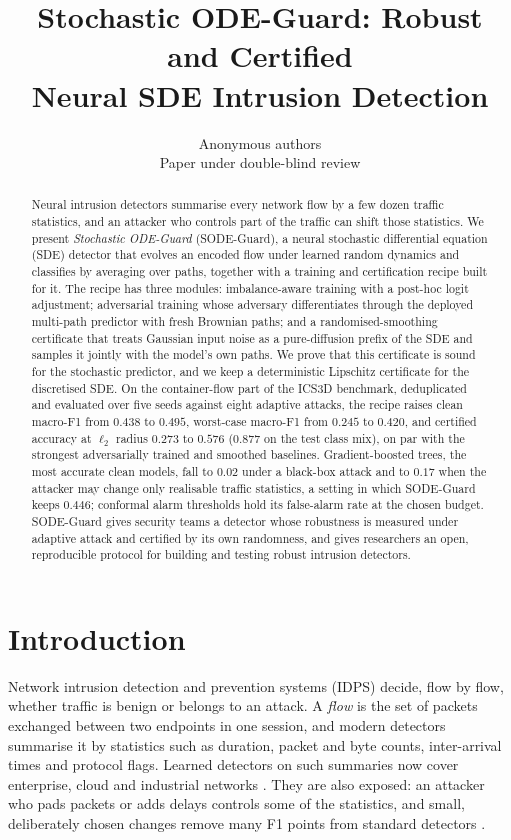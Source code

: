 \documentclass{article}
\title{Stochastic ODE-Guard: Robust and Certified\\Neural SDE Intrusion Detection}
\author{Anonymous authors\\Paper under double-blind review}
\theoremstyle{definition}
\begin{document}
\maketitle

\begin{abstract}
Neural intrusion detectors summarise every network flow by a few dozen traffic
statistics, and an attacker who controls part of the traffic can shift those
statistics. We present \emph{Stochastic ODE-Guard} (SODE-Guard), a neural
stochastic differential equation (SDE) detector that evolves an encoded flow
under learned random dynamics and classifies by averaging over paths, together
with a training and certification recipe built for it. The recipe has three
modules: imbalance-aware training with a post-hoc logit adjustment; adversarial
training whose adversary differentiates through the deployed multi-path
predictor with fresh Brownian paths; and a randomised-smoothing certificate
that treats Gaussian input noise as a pure-diffusion prefix of the SDE and
samples it jointly with the model's own paths. We prove that this certificate
is sound for the stochastic predictor, and we keep a deterministic Lipschitz
certificate for the discretised SDE. On the container-flow part of the ICS3D
benchmark, deduplicated and evaluated over five seeds against eight adaptive
attacks, the recipe raises clean macro-F1 from $0.438$ to $0.495$, worst-case
macro-F1 from $0.245$ to $0.420$, and certified accuracy at $\ell_2$ radius
$0.273$ to $0.576$ ($0.877$ on the test class mix), on par with the strongest
adversarially trained and smoothed baselines. Gradient-boosted trees, the most
accurate clean models, fall to $0.02$ under a black-box attack and to $0.17$
when the attacker may change only realisable traffic statistics, a setting in
which SODE-Guard keeps $0.446$; conformal alarm thresholds hold its false-alarm
rate at the chosen budget.
SODE-Guard gives security teams a detector whose robustness is measured under
adaptive attack and certified by its own randomness, and gives researchers an
open, reproducible protocol for building and testing robust intrusion detectors.
\end{abstract}

\section{Introduction}\label{sec:intro}
Network intrusion detection and prevention systems (IDPS) decide, flow by flow,
whether traffic is benign or belongs to an attack. A \emph{flow} is the set of
packets exchanged between two endpoints in one session, and modern detectors
summarise it by statistics such as duration, packet and byte counts,
inter-arrival times and protocol flags. Learned detectors on such summaries now
cover enterprise, cloud and industrial networks
\citep{lo2022egraphsage,wu2022rtids,anaedevha2026mstgnn}.
They are also exposed: an attacker who pads packets or adds delays controls
some of the statistics, and small, deliberately chosen changes remove many F1
points from standard detectors \citep{ennaji2024advsurvey,vitorino2024advbench,anaedevha2024robust}.
\end{document}
